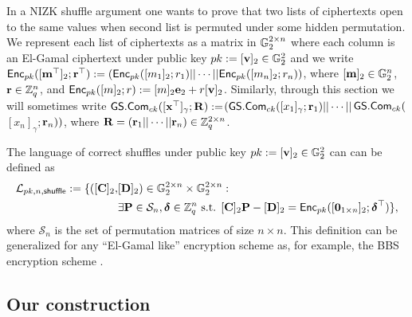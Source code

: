In a NIZK shuffle argument one wants to prove that two lists of ciphertexts open to the same values when second list is permuted under some hidden permutation.
We represent each list of ciphertexts as a matrix in $\mathbb{G}_2^{2\times n}$ where each column is an El-Gamal ciphertext under public key $pk:=[\mathbf{v}]_2\in\mathbb{G}^2_2$ and we write $\mathsf{Enc}_{pk}([\mathbf{m}^\top]_2;\mathbf{r}^\top):=(\mathsf{Enc}_{pk}([m_1]_2;r_1)||\cdots||\mathsf{Enc}_{pk}([m_n]_2;r_n))$, where $[\mathbf{m}]_2\in\mathbb{G}_2^n$, $\mathbf{r}\in\mathbb{Z}_q^n$, and $\mathsf{Enc}_{pk}([m]_2;r):=[m]_2\mathbf{e}_2+r[\mathbf{v}]_2$. Similarly, through this section we will sometimes write ${\mathsf{GS}}.\mathsf{Com}_{ck}([\mathbf{x}^\top]_\gamma;\mathbf{{R}}):=$\-$({\mathsf{GS}}.\mathsf{Com}_{ck}([x_1]_\gamma;\mathbf{r}_1)||\cdots||$${\mathsf{GS}}.\mathsf{Com}_{ck}($$[x_n]_\gamma;$$\mathbf{r}_n))$, where $\mathbf{{R}}=(\mathbf{r}_1||\cdots||\mathbf{r}_n)\in\mathbb{Z}_q^{2\times n}$.

The language of correct shuffles under public key $pk:=[\mathbf{v}]_2\in\mathbb{G}^2_2$ can can be defined as 
\begin{align*}
\mathcal{L}_{pk,n,\mathsf{shuffle}}:=\{([\mathbf{{C}}]_2,&[\mathbf{{D}}]_2)\in\mathbb{G}_2^{2\times n}\times \mathbb{G}_2^{2\times n} :\\
                                                         &\exists \mathbf{{P}}\in\mathcal{S}_n,{\boldsymbol \delta}\in\mathbb{Z}_q^n \text{ s.t. } {[\mathbf{{C}}]_2\mathbf{{P}}-[\mathbf{{D}}]_2 = \mathsf{Enc}_{pk}([\mathbf{0}_{1\times n}]_2;{\boldsymbol \delta}^\top)}\},
\end{align*}
where $\mathcal{S}_n$ is the set of permutation matrices of size $n\times n$. This definition can be generalized for any ``El-Gamal like'' encryption scheme as, for example, the BBS encryption scheme \cite{C:BonBoySha04}.

 
\subsection{Our construction}

